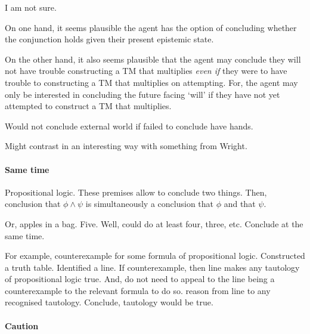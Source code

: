 \begin{note}[No entanglement]
{    I am not sure.

    On one hand, it seems plausible the agent has the option of concluding whether the conjunction holds given their present epistemic state.

    On the other hand, it also seems plausible that the agent may conclude they will not have trouble constructing a TM that multiplies \emph{even if} they were to have trouble to constructing a TM that multiplies on attempting.
    For, the agent may only be interested in concluding the future facing `will' if they have not yet attempted to construct a TM that multiplies.
  }
\end{note}

\begin{note}[Maybe?]
  Would not conclude external world if failed to conclude have hands.

  {
    \color{red}
    Might contrast in an interesting way with something from Wright.
  }
\end{note}

\paragraph{Same time}

\begin{note}
  Propositional logic.
  These premises allow to conclude two things.
  Then, conclusion that \(\phi \land \psi\) is simultaneously a conclusion that \(\phi\) and that \(\psi\).

  Or, apples in a bag.
  Five.
  Well, could do at least four, three, etc.
  Conclude at the same time.
\end{note}

\begin{note}
  For example, counterexample for some formula of propositional logic.
  Constructed a truth table.
  Identified a line.
  If counterexample, then line makes any tautology of propositional logic true.
  And, do not need to appeal to the line being a counterexample to the relevant formula to do so.
  reason from line to any recognised tautology.
  Conclude, tautology would be true.
\end{note}

\paragraph{Caution}

